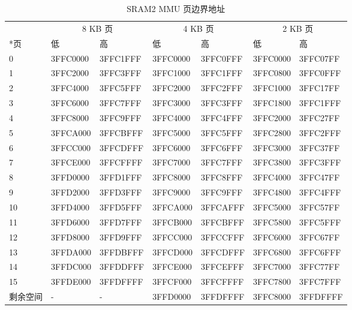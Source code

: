 \begin{table}[H]
    \centering
    \caption{SRAM2 MMU 页边界地址}
    \label{table:Page_Boundaries_SRAM2_MMU}
     \begin{tabular}[h]{ |p{1.5cm}|p{2cm}|p{2cm}|p{2cm}|p{2cm}|p{2cm}|p{2cm}|}
        \hline
        \rowcolor{lightgray}
        & \multicolumn{2}{c|}{8 KB 页} & \multicolumn{2}{c|}{4 KB 页} & \multicolumn{2}{c|}{2 KB 页} \\
        \cline{2-6}
        \rowcolor{lightgray}
        \multirow{-2}*{页} & 低 & 高 & 低 & 高 & 低 & 高 \\
        \hline
   	0 & 3FFC0000 & 3FFC1FFF & 3FFC0000 & 3FFC0FFF & 3FFC0000 & 3FFC07FF \\ \hline
	1 & 3FFC2000 & 3FFC3FFF & 3FFC1000 & 3FFC1FFF & 3FFC0800 & 3FFC0FFF \\ \hline
	2 & 3FFC4000 & 3FFC5FFF & 3FFC2000 & 3FFC2FFF & 3FFC1000 & 3FFC17FF \\ \hline
	3 & 3FFC6000 & 3FFC7FFF & 3FFC3000 & 3FFC3FFF & 3FFC1800 & 3FFC1FFF \\ \hline
	4 & 3FFC8000 & 3FFC9FFF & 3FFC4000 & 3FFC4FFF & 3FFC2000 & 3FFC27FF \\ \hline
	5 & 3FFCA000 & 3FFCBFFF & 3FFC5000 & 3FFC5FFF & 3FFC2800 & 3FFC2FFF \\ \hline
	6 & 3FFCC000 & 3FFCDFFF & 3FFC6000 & 3FFC6FFF & 3FFC3000 & 3FFC37FF \\ \hline
	7 & 3FFCE000 & 3FFCFFFF & 3FFC7000 & 3FFC7FFF & 3FFC3800 & 3FFC3FFF \\ \hline
	8 & 3FFD0000 & 3FFD1FFF & 3FFC8000 & 3FFC8FFF & 3FFC4000 & 3FFC47FF \\ \hline
	9 & 3FFD2000 & 3FFD3FFF & 3FFC9000 & 3FFC9FFF & 3FFC4800 & 3FFC4FFF \\ \hline
	10 & 3FFD4000 & 3FFD5FFF & 3FFCA000 & 3FFCAFFF & 3FFC5000 & 3FFC57FF \\ \hline
	11 & 3FFD6000 & 3FFD7FFF & 3FFCB000 & 3FFCBFFF & 3FFC5800 & 3FFC5FFF \\ \hline
	12 & 3FFD8000 & 3FFD9FFF & 3FFCC000 & 3FFCCFFF & 3FFC6000 & 3FFC67FF \\ \hline
	13 & 3FFDA000 & 3FFDBFFF & 3FFCD000 & 3FFCDFFF & 3FFC6800 & 3FFC6FFF \\ \hline
	14 & 3FFDC000 & 3FFDDFFF & 3FFCE000 & 3FFCEFFF & 3FFC7000 & 3FFC77FF \\ \hline
	15 & 3FFDE000 & 3FFDFFFF & 3FFCF000 & 3FFCFFFF & 3FFC7800 & 3FFC7FFF \\ \hline
	剩余空间 & - & - & 3FFD0000 & 3FFDFFFF & 3FFC8000 & 3FFDFFFF \\ \hline
    \end{tabular}
\end{table}
